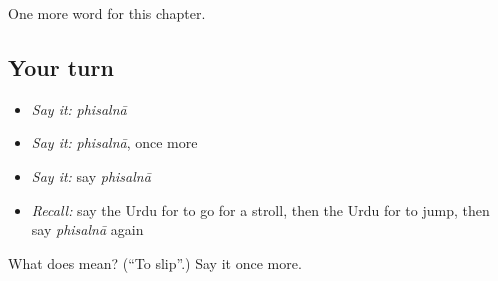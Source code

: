 \begin{grammarlens}[title={What you've built}]
One more word for this chapter.
\end{grammarlens}

\subsection*{Your turn}
\begin{itemize}
\raggedright
  \item \emph{Say it:} \emph{phisalnā}
  \item \emph{Say it:} \emph{phisalnā}, once more
  \item \emph{Say it:} say \emph{phisalnā}
  \item \emph{Recall:} say the Urdu for to go for a stroll, then the Urdu for to jump, then say \emph{phisalnā} again
\end{itemize}

\begin{tcolorbox}[breakable,colback=teal!4,colframe=teal!35!black,title={Before you move on}]
What does  mean? (\textquotedblleft{}To slip\textquotedblright{}.) Say it once more.
\end{tcolorbox}

